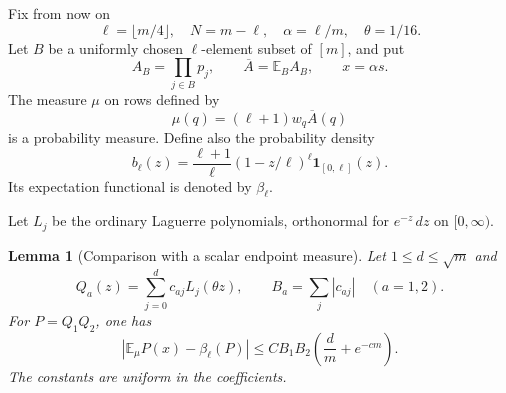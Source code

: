 \documentclass[11pt]{article}
\newtheorem{lemma}{Lemma}
\newcommand{\E}{\mathbb E}
\begin{document}
Fix from now on
\[
 \ell=\lfloor m/4\rfloor,\quad N=m-\ell,\quad
 \alpha=\ell/m,\quad \theta=1/16.
\]
Let $B$ be a uniformly chosen $\ell$-element subset of $[m]$, and put
\[
 A_B=\prod_{j\in B}p_j,\qquad \overline A=\E_B A_B,
 \qquad x=\alpha s.
\]
The measure $\mu$ on rows defined by
\[
 \mu(q)=(\ell+1)w_q\overline A(q)
\]
is a probability measure. Define also the probability density
\[
 b_\ell(z)=\frac{\ell+1}{\ell}(1-z/\ell)^\ell
                 \boldsymbol1_{[0,\ell]}(z).
\]
Its expectation functional is denoted by $\beta_\ell$.

Let $L_j$ be the ordinary Laguerre polynomials, orthonormal for
$e^{-z}\,dz$ on $[0,\infty)$.

\begin{lemma}[Comparison with a scalar endpoint measure]\label{comparison}
Let $1\le d\le\sqrt m$ and
\[
 Q_a(z)=\sum_{j=0}^d c_{aj}L_j(\theta z),\qquad
 B_a=\sum_j|c_{aj}|\quad(a=1,2).
\]
For $P=Q_1Q_2$, one has
\[
 \left|\E_\mu P(x)-\beta_\ell(P)\right|
       \le C B_1B_2\left(\frac d m+e^{-cm}\right).
 \tag{*}
\]
The constants are uniform in the coefficients.
\end{lemma}
\end{document}
